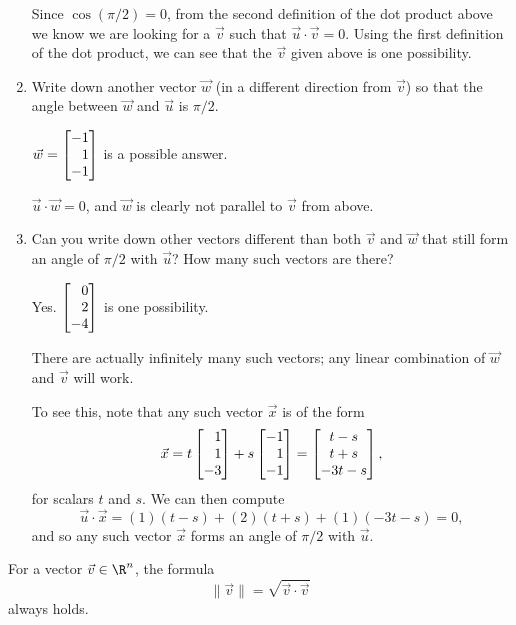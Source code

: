 \documentclass{problemset}
\newcommand{\displayonlynewpage}{\begin{displayonly}\newpage\end{displayonly}}
\newcommand{\bookonlynewpage}{\begin{bookonly}\newpage\end{bookonly}}
\begin{document}
\begin{parts}
\begin{enumerate}
\begin{solution}
					Since $\cos(\pi/2) = 0$, from the second definition of the dot
					product above we know we are looking for a $\vec v$ such that
					$\vec u \cdot \vec v = 0$. Using the first definition of the
					dot product, we can see that the $\vec v$ given above is one
					possibility.
				\end{solution}
			\item Write down another vector $\vec w$ (in a different direction from
				$\vec v$) so that the angle between $\vec w$ and $\vec u$ is $\pi/2$.
				\begin{solution}
					$\vec w = \mat{-1\\1\\-1}$ is a possible answer.

					$\vec u \cdot \vec w = 0$, and $\vec w$ is clearly not parallel
					to $\vec v$ from above.
				\end{solution}
			\item Can you write down other vectors different than both $\vec v$
				and $\vec w$ that still	form an angle of $\pi/2$ with $\vec u$?
				How many such vectors are there?
				\begin{solution}
					Yes. $\mat{0\\2\\-4}$ is one possibility.

					There are actually infinitely many such vectors; any linear
					combination of $\vec w$ and $\vec v$ will work.

					To see this, note that any such vector $\vec x$ is of the form
					\[
						\vec x = t \mat{1\\1\\-3} + s \mat{-1\\1\\-1}
						= \matc{t-s\\t+s\\-3t-s},
					\]
					for scalars $t$ and $s$. We can then compute
					\[
						\vec u \cdot \vec x = (1)(t-s) + (2)(t+s) + (1)(-3t-s) = 0,
					\]
					and so any such vector $\vec x$ forms an angle of $\pi/2$
					with $\vec u$.
				\end{solution}
		\end{enumerate}
	\end{parts}

	\bookonlynewpage
	\displayonlynewpage
	\begin{theorem}
		For a vector $\vec v\in \R^n$, the formula
		\[
			\|\vec v\| = \sqrt{\vec v\cdot \vec v}
		\]
		always holds.
	\end{theorem}
\end{document}

